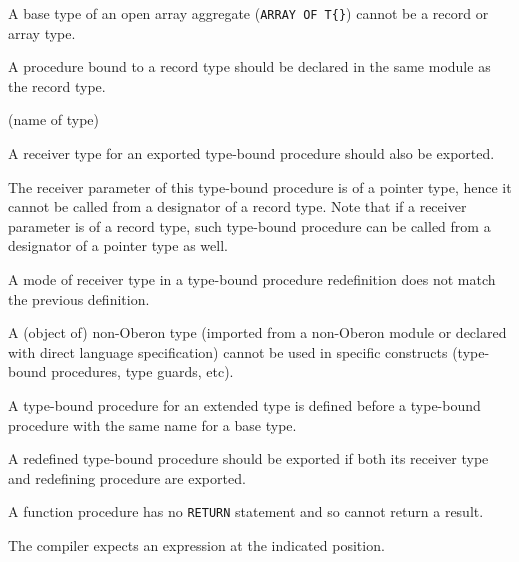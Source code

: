 
A base type of an open array aggregate (\verb'ARRAY OF T{}')
cannot be a record or array type.


A procedure bound to a record type should be declared in the same module
as the record type.

(name of type)

A receiver type for an exported type-bound procedure should also be exported.


The receiver parameter of this type-bound procedure is of a pointer type,
hence it cannot be called from a designator of a record type.
Note that if a receiver parameter is of a record type, such type-bound
procedure can be called from a designator of a pointer type as well.


A mode of receiver type in a type-bound procedure redefinition does not
match the previous definition.


A (object of) non-Oberon type (imported from a non-Oberon module or
declared with direct language specification) cannot be used in specific
\ot{} constructs (type-bound procedures, type guards, etc).


A type-bound procedure for an extended type is defined before
a type-bound procedure with the same name for a base type.


A redefined type-bound procedure should be exported if both its
receiver type and redefining procedure are exported.


A function procedure has no \verb'RETURN' statement and so cannot return a
result.


The compiler expects an expression at the indicated position.

